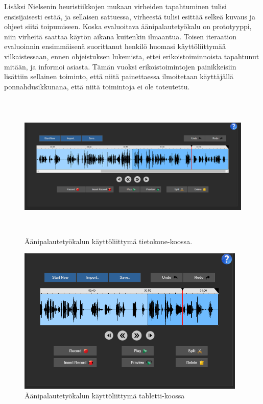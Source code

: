 \documentclass[utf8]{gradu3}
\begin{document}
Lisäksi Nielsenin heuristiikkojen mukaan virheiden tapahtuminen tulisi ensisijaisesti estää, ja sellaisen sattuessa, virheestä tulisi esittää selkeä kuvaus ja ohjeet siitä toipumiseen. Koska evaluoitava äänipalautetyökalu on prototyyppi, niin virheitä saattaa käytön aikana kuitenkin ilmaantua. Toisen iteraation evaluoinnin ensimmäisenä suorittanut henkilö huomasi käyttöliittymää vilkaistessaan, ennen ohjeistuksen lukemista, ettei erikoistoiminnoista tapahtunut mitään, ja informoi asiasta. Tämän vuoksi erikoistoimintojen painikkeisiin lisättiin sellainen toiminto, että niitä painettaessa ilmoitetaan käyttäjällä ponnahdusikkunana, että niitä toimintoja ei ole toteutettu.

\begin{figure}[h]\centering
  \includegraphics[height=7cm,keepaspectratio]{UI}
  \caption[]{Äänipalautetyökalun käyttöliittymä tietokone-koossa.}
  \label{fig:UI}
\end{figure}

\begin{figure}[h]\centering
  \includegraphics[height=7cm,keepaspectratio]{UI_tablet}
  \caption[]{Äänipalautetyökalun käyttöliittymä tabletti-koossa}
  \label{fig:UI_tablet}
\end{figure}
\end{document}

